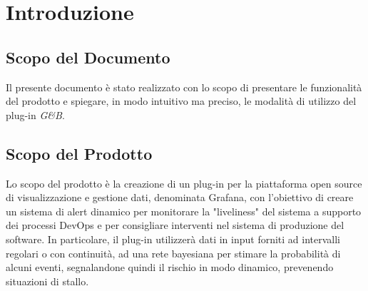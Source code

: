\section{Introduzione}\label{Intro}

\subsection{Scopo del Documento}
Il presente documento è stato realizzato con lo scopo di presentare le funzionalità del prodotto e spiegare, in modo intuitivo ma preciso, le modalità di utilizzo del plug-in \textit{G\&B}.

\subsection{Scopo del Prodotto}
Lo scopo del prodotto è la creazione di un plug-in per la piattaforma open source di visualizzazione e gestione dati, denominata Grafana, con l'obiettivo di creare un sistema di alert dinamico per monitorare la "liveliness" del sistema a supporto dei processi DevOps e per consigliare interventi nel sistema di produzione del software. In particolare, il plug-in utilizzerà dati in input forniti ad intervalli regolari o con continuità, ad una rete bayesiana per stimare la probabilità di alcuni eventi, segnalandone quindi il rischio in modo dinamico, prevenendo situazioni di stallo.

